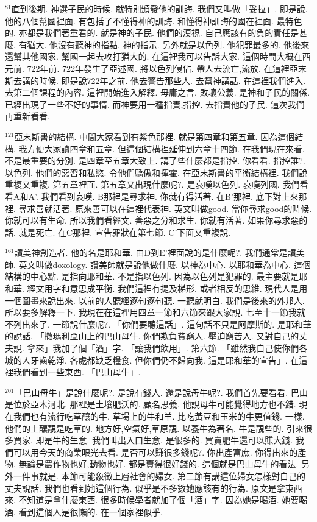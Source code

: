 \documentclass{book}
\begin{document}
$^{81}$直到後期.
神選子民的時候.
就特別頒發他的訓誨.
我們又叫做「妥拉」.
即是說.
他的八個幫國裡面.
有包括了不懂得神的訓誨.
和懂得神訓誨的國在裡面.
最特色的.
亦都是我們著重看的.
就是神的子民.
他們的漠視.
自己應該有的負的責任是甚麼.
有猶大.
他沒有聽神的指點.
神的指示.
另外就是以色列.
他犯罪最多的.
他後來還幫其他國家.
幫國一起去攻打猶大的.
在這裡我可以告訴大家.
這個時間大概在西元前.
722年前.
722年發生了亞述國.
將以色列侵佔.
帶人去流亡,流放.
在這裡亞末斯去講的時候.
即是說722年之前.
他去警告那些人.
去幫神講話.
在這裡我們進入.
去第二個課程的內容.
這裡開始進入解釋.
毋庸之言.
敗壞公義.
是神和子民的關係.
已經出現了一些不好的事情.
而神要用一種指責,指控.
去指責他的子民.
這次我們再重新看看.

$^{121}$亞末斯書的結構.
中間大家看到有紫色那裡.
就是第四章和第五章.
因為這個結構.
我方便大家讀四章和五章.
但這個結構裡延伸到六章十四節.
在我們現在來看.
不是最重要的分別.
是四章至五章大致上.
講了些什麼都是指控.
你看看.
指控誰?.
以色列.
他們的惡習和私慾.
令他們驕傲和揮霍.
在亞末斯書的平衡結構裡.
我們說重複又重複.
第五章裡面.
第五章又出現什麼呢?.
是哀嘆以色列.
哀嘆列國.
我們看看A和A'.
我們看到哀嘆.
B那裡是尋求神.
你就有得活著.
在B'那裡.
底下對上來那裡.
尋求善就活著.
原來善可以在這裡代表神.
英文叫做good.
當你尋求good的時候.
你就可以有生命.
所以我們看經文.
善惡之分和求生.
你就有活著.
如果你尋求惡的話.
就是死亡.
在C那裡.
宣告罪狀在第七節.
C'下面又重複說.

$^{161}$讚美神創造者.
他的名是耶和華.
由D到E'裡面說的是什麼呢?.
我們通常是讚美師.
英文叫做doxology.
讚美師就是說他做什麼.
以神為中心.
以耶和華為中心.
這個結構的中心點.
是指向耶和華.
不是指以色列.
因為以色列是犯罪的.
最主要就是耶和華.
經文用字和意思成平衡.
我們這裡有提及梯形.
或者相反的思維.
現代人是用一個圖畫來說出來.
以前的人聽經逐句逐句聽.
一聽就明白.
我們是後來的外邦人.
所以要多解釋一下.
我現在在這裡用四章一節和六節來跟大家說.
七至十一節我就不列出來了.
一節說什麼呢?.
「你們要聽這話」.
這句話不只是阿摩斯的.
是耶和華的說話.
「撒瑪利亞山上的巴山母牛.
你們欺負貧窮人.
壓迫窮苦人.
又對自己的丈夫說.
拿來」我加了個「酒」字.
「讓我們飲用」.
第六節.
「雖然我自己使你們各城的人牙齒乾淨.
各處都缺乏糧食.
但你們仍不歸向我.
這是耶和華的宣告」.
在這裡我們看到一些東西.
「巴山母牛」.

$^{201}$「巴山母牛」是說什麼呢?.
是說有錢人.
還是說母牛呢?.
我們首先要看看.
巴山是位於亞木河北.
那裡是土壤肥沃的.
顧名思義.
他說母牛可能覺得地方也不錯.
現在我們也有流行吃草釀的牛.
草場上的牛和羊.
比吃黃豆和玉米的牛更值錢.
一樣.
他們的土釀靚是吃草的.
地方好,空氣好,草原靚.
以養牛為著名.
牛是靚些的.
引來很多買家.
即是牛的生意.
我們叫出入口生意.
是很多的.
買賣肥牛還可以賺大錢.
我們可以用今天的商業眼光去看.
是否可以賺很多錢呢?.
你出產富庶.
你得出來的產物.
無論是農作物也好,動物也好.
都是賣得很好錢的.
這個就是巴山母牛的看法.
另外一件事就是.
本節可能象徵上層社會的婦女.
第二節有講這位婦女怎樣對自己的丈夫說話.
我們也看到她這個行為.
似乎是不多數她應該有的行為.
原文是拿東西來.
不知道是拿什麼東西.
很多時候學者就加了個「酒」字.
因為她是喝酒.
她要喝酒.
看到這個人是很懶的.
在一個家裡似乎.
\end{document}

